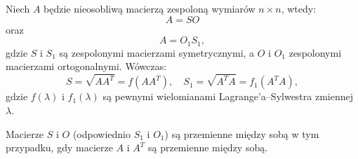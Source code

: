 \begin{theorem}
Niech $A$ będzie nieosobliwą macierzą zespoloną wymiarów $n \times n$, wtedy:
\begin{equation}\label{eq:local_polar_decomposition_left}
    A = SO
\end{equation}
oraz
\begin{equation}\label{eq:local_polar_decomposition_right}
    A = O_1S_1,
\end{equation}
gdzie $S$ i $S_1$ są zespolonymi macierzami symetrycznymi, a $O$ i $O_1$ zespolonymi macierzami ortogonalnymi. Wówczas:
$$S = \sqrt{AA^T} = f(AA^T), \quad S_1 = \sqrt{A^TA} = f_1(A^TA),$$
gdzie $f(\lambda)$ i $f_1(\lambda)$ są pewnymi wielomianami Lagrange'a--Sylwestra zmiennej $\lambda$.

Macierze $S$ i $O$ (odpowiednio $S_1$ i $O_1$) są przemienne między sobą w tym przypadku, gdy macierze $A$ i $A^T$ są przemienne między sobą.   
\end{theorem}

